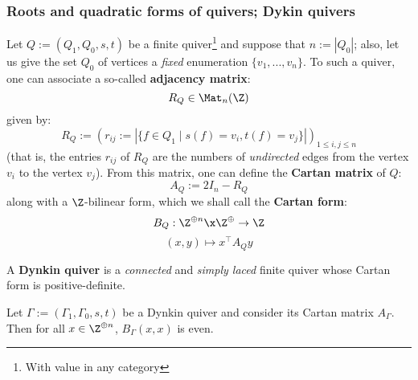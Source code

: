        \subsubsection{Roots and quadratic forms of quivers; Dykin quivers}
            \begin{definition} \label{def: adjacency_and_cartan_matrices}
                Let $Q := (Q_1, Q_0, s, t)$ be a finite quiver\footnote{With value in any category} and suppose that $n := |Q_0|$; also, let us give the set $Q_0$ of vertices a \textit{fixed} enumeration $\{v_1, ..., v_n\}$. To such a quiver, one can associate a so-called \textbf{adjacency matrix}:
                    $$R_Q \in \Mat_n(\Z)$$
                given by:
                    $$R_Q := (r_{ij} := |\{f \in Q_1 \mid s(f) = v_i, t(f) = v_j\}|)_{1 \leq i, j \leq n}$$
                (that is, the entries $r_{ij}$ of $R_Q$ are the numbers of \textit{undirected} edges from the vertex $v_i$ to the vertex $v_j$). From this matrix, one can define the \textbf{Cartan matrix} of $Q$:
                    $$A_Q := 2I_n - R_Q$$
                along with a $\Z$-bilinear form, which we shall call the \textbf{Cartan form}:
                    $$B_Q: \Z^{\oplus n} \x \Z^{\oplus} \to \Z$$
                    $$(x, y) \mapsto x^{\top} A_Q y$$                
            \end{definition}
            \begin{definition} \label{def: dynkin_quivers}
                A \textbf{Dynkin quiver} is a \textit{connected} and \textit{simply laced} finite quiver whose Cartan form is positive-definite.
            \end{definition}
            \begin{proposition}
                Let $\Gamma := (\Gamma_1, \Gamma_0, s, t)$ be a Dynkin quiver and consider its Cartan matrix $A_{\Gamma}$. Then for all $x \in \Z^{\oplus n}$, $B_{\Gamma}(x, x)$ is even.  
            \end{proposition}
